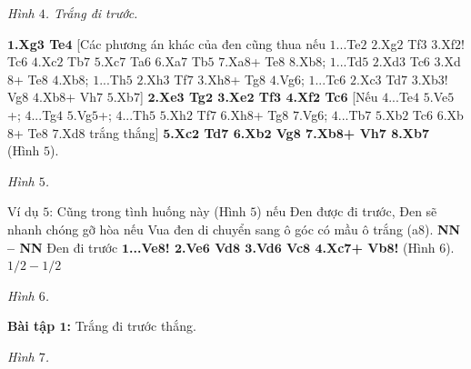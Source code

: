 \begin{multicols}{2}
\begin{center}
		\newgame
		\scalebox{0.85}\showboard
		\vskip 0.1cm
		\textit{\small\color{gocco}Hình $4$. Trắng đi trước.}
	\end{center}
	\textbf{\color{gocco}$\pmb{1}$.Xg$\pmb{3}$ Te$\pmb{4}$} [Các phương án khác của đen cũng thua nếu $1$...Te$2$ $2$.Xg$2$ Tf$3$ $3$.Xf$2$! Tc$6$ $4$.Xc$2$ Tb$7$ $5$.Xc$7$ Ta$6$ $6$.Xa$7$ Tb$5$ $7$.Xa$8$+ Te$8$ $8$.Xb$8$; $1$...Td$5$ $2$.Xd$3$ Tc$6$ $3$.Xd$8$+ Te$8$ $4$.Xb$8$; $1$...Th$5$ $2$.Xh$3$ Tf$7$ $3$.Xh$8$+ Tg$8$ $4$.Vg$6$; $1$...Tc$6$ $2$.Xc$3$ Td$7$ $3$.Xb$3$! Vg$8$ $4$.Xb$8$+ Vh$7$ $5$.Xb$7$]
	\vskip 0.1cm
	\textbf{\color{gocco}$\pmb{2}$.Xe$\pmb{3}$ Tg$\pmb{2}$ $\pmb{3}$.Xe$\pmb{2}$ Tf$\pmb{3}$ $\pmb{4}$.Xf$\pmb{2}$ Tc$\pmb{6}$} [Nếu $4$...Te$4$ $5$.Ve$5$+; $4$...Tg$4$ $5$.Vg$5$+; $4$...Th$5$ $5$.Xh$2$ Tf$7$ $6$.Xh$8$+ Tg$8$ $7$.Vg$6$; $4$...Tb$7$ $5$.Xb$2$ Tc$6$ $6$.Xb$8$+ Te$8$ $7$.Xd$8$ trắng thắng]
	\vskip 0.1cm
	\textbf{\color{gocco}$\pmb{5}$.Xc$\pmb{2}$ Td$\pmb{7}$ $\pmb{6}$.Xb$\pmb{2}$ Vg$\pmb{8}$ $\pmb{7}$.Xb$\pmb{8}$+ Vh$\pmb{7}$ $\pmb{8}$.Xb$\pmb{7}$} (Hình $5$).
	\begin{center}
		\newgame
		\scalebox{0.85}\showboard
		\vskip 0.1cm
		\textit{\small\color{gocco}Hình $5$.}
	\end{center}
	Ví dụ $5$:
	\vskip 0.1cm
	Cũng trong tình huống này (Hình $5$) nếu Đen được đi trước, Đen sẽ nhanh chóng gỡ hòa nếu Vua đen di chuyển  sang ô góc có mầu ô trắng (a$8$).
	\vskip 0.1cm
	\textbf{\color{gocco}NN -- NN}
	\vskip 0.1cm
	Đen đi trước
	\vskip 0.1cm
	\textbf{\color{gocco}$\pmb{1}$...Ve$\pmb{8}$! $\pmb{2}$.Ve$\pmb{6}$ Vd$\pmb{8}$ $\pmb{3}$.Vd$\pmb{6}$ Vc$\pmb{8}$ $\pmb{4}$.Xc$\pmb{7}$+ Vb$\pmb{8}$!} (Hình $6$).
	\vskip 0.1cm
	$1/2 - 1/2$
	\begin{center}
		\newgame
		\scalebox{0.85}\showboard
		\vskip 0.1cm
		\textit{\small\color{gocco}Hình $6$.}
	\end{center}
	\textbf{\color{gocco}Bài tập $\pmb{1}$:} Trắng đi trước thắng.
	\begin{center}
		\newgame
		\scalebox{0.85}\showboard
		\vskip 0.1cm
		\textit{\small\color{gocco}Hình $7$.}
	\end{center}
\end{multicols}




